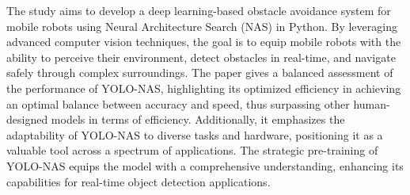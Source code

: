 The study aims to develop a deep learning-based obstacle avoidance system for mobile robots using Neural Architecture Search (NAS) in Python. By leveraging advanced computer vision techniques, the goal is to equip mobile robots with the ability to perceive their environment, detect obstacles in real-time, and navigate safely through complex surroundings. The paper gives a balanced assessment of the performance of YOLO-NAS, highlighting its optimized efficiency in achieving an optimal balance between accuracy and speed, thus surpassing other human-designed models in terms of efficiency. Additionally, it emphasizes the adaptability of YOLO-NAS to diverse tasks and hardware, positioning it as a valuable tool across a spectrum of applications. The strategic pre-training of YOLO-NAS equips the model with a comprehensive understanding, enhancing its capabilities for real-time object detection applications. 
